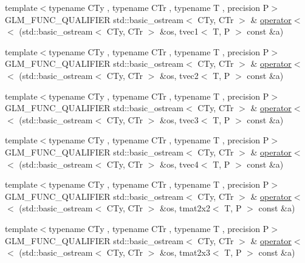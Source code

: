 \begin{DoxyCompactItemize}
\item 
{\footnotesize template$<$typename C\+Ty , typename C\+Tr , typename T , precision P$>$ }\\G\+L\+M\+\_\+\+F\+U\+N\+C\+\_\+\+Q\+U\+A\+L\+I\+F\+I\+E\+R std\+::basic\+\_\+ostream$<$ C\+Ty, C\+Tr $>$ \& \hyperlink{group__gtx__io_ga171289d1671b75e033a1b078c68a7460}{operator$<$$<$} (std\+::basic\+\_\+ostream$<$ C\+Ty, C\+Tr $>$ \&os, tvec1$<$ T, P $>$ const \&a)
\item 
{\footnotesize template$<$typename C\+Ty , typename C\+Tr , typename T , precision P$>$ }\\G\+L\+M\+\_\+\+F\+U\+N\+C\+\_\+\+Q\+U\+A\+L\+I\+F\+I\+E\+R std\+::basic\+\_\+ostream$<$ C\+Ty, C\+Tr $>$ \& \hyperlink{group__gtx__io_ga0a3bca262adbba991f394d8d3d52e10d}{operator$<$$<$} (std\+::basic\+\_\+ostream$<$ C\+Ty, C\+Tr $>$ \&os, tvec2$<$ T, P $>$ const \&a)
\item 
{\footnotesize template$<$typename C\+Ty , typename C\+Tr , typename T , precision P$>$ }\\G\+L\+M\+\_\+\+F\+U\+N\+C\+\_\+\+Q\+U\+A\+L\+I\+F\+I\+E\+R std\+::basic\+\_\+ostream$<$ C\+Ty, C\+Tr $>$ \& \hyperlink{group__gtx__io_ga0d6cfb5d138639b90f18d7bbb2a4ae56}{operator$<$$<$} (std\+::basic\+\_\+ostream$<$ C\+Ty, C\+Tr $>$ \&os, tvec3$<$ T, P $>$ const \&a)
\item 
{\footnotesize template$<$typename C\+Ty , typename C\+Tr , typename T , precision P$>$ }\\G\+L\+M\+\_\+\+F\+U\+N\+C\+\_\+\+Q\+U\+A\+L\+I\+F\+I\+E\+R std\+::basic\+\_\+ostream$<$ C\+Ty, C\+Tr $>$ \& \hyperlink{group__gtx__io_ga948ab426a879f24236d8978ee9b5fade}{operator$<$$<$} (std\+::basic\+\_\+ostream$<$ C\+Ty, C\+Tr $>$ \&os, tvec4$<$ T, P $>$ const \&a)
\item 
{\footnotesize template$<$typename C\+Ty , typename C\+Tr , typename T , precision P$>$ }\\G\+L\+M\+\_\+\+F\+U\+N\+C\+\_\+\+Q\+U\+A\+L\+I\+F\+I\+E\+R std\+::basic\+\_\+ostream$<$ C\+Ty, C\+Tr $>$ \& \hyperlink{group__gtx__io_ga61fbdb6ad70c4c8d750a847251fa4a4a}{operator$<$$<$} (std\+::basic\+\_\+ostream$<$ C\+Ty, C\+Tr $>$ \&os, tmat2x2$<$ T, P $>$ const \&a)
\item 
{\footnotesize template$<$typename C\+Ty , typename C\+Tr , typename T , precision P$>$ }\\G\+L\+M\+\_\+\+F\+U\+N\+C\+\_\+\+Q\+U\+A\+L\+I\+F\+I\+E\+R std\+::basic\+\_\+ostream$<$ C\+Ty, C\+Tr $>$ \& \hyperlink{group__gtx__io_ga032043616f87c7eefaf4d83a20f779a5}{operator$<$$<$} (std\+::basic\+\_\+ostream$<$ C\+Ty, C\+Tr $>$ \&os, tmat2x3$<$ T, P $>$ const \&a)

\end{DoxyCompactItemize}
